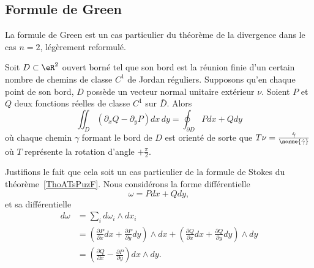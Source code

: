 \subsection{Formule de Green}

La formule de Green est un cas particulier du théorème de la divergence dans le cas \( n = 2\), légèrement reformulé.
\begin{theorem}     \label{THOooQSWMooAZasTl}
	Soit \( D \subset \eR^2\) ouvert borné tel que son bord est la réunion finie d'un certain nombre de chemins de classe \( C^1\) de Jordan réguliers.  Supposons qu'en chaque point de son bord, \( D\) possède un vecteur normal unitaire extérieur \( \nu\). Soient \( P\) et \( Q\) deux fonctions réelles de classe \( C^1\) sur \( \bar D\). Alors
	\begin{equation}  \label{EqYLblSqV}
		\iint_D (\partial_xQ - \partial_yP)dx\,dy = \oint_{\partial D}
		Pd x + Q d y
	\end{equation}
	où chaque chemin \( \gamma\) formant le bord de \( D\) est orienté de
	sorte que \( T \nu = \frac{\dot\gamma}{\norme{\dot\gamma}}\) où \( T\)
	représente la rotation d'angle \( +\frac\pi2\).
\end{theorem}

Justifions le fait que cela soit un cas particulier de la formule de Stokes du théorème~\ref{ThoATsPuzF}. Nous considérons la forme différentielle
\begin{equation}
	\omega=Pdx+Qdy,
\end{equation}
et sa différentielle
\begin{subequations}
	\begin{align}
		d\omega & =\sum_id\omega_i\wedge dx_i                                                                                                                                                                      \\
		        & =\left( \frac{ \partial P }{ \partial x }dx+\frac{ \partial P }{ \partial y }dy \right)\wedge dx+\left( \frac{ \partial Q }{ \partial x }dx+\frac{ \partial Q }{ \partial y }dy \right)\wedge dy \\
		        & =\left( \frac{ \partial Q }{ \partial x }-\frac{ \partial P }{ \partial y } \right)dx\wedge dy.
	\end{align}
\end{subequations}

